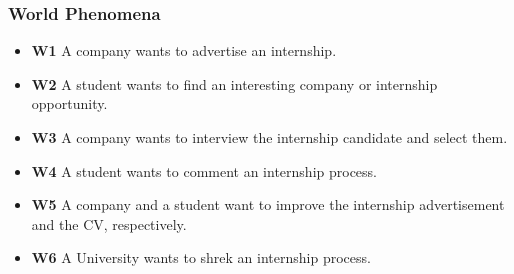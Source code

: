 \documentclass[a4paper,12pt]{article}
\begin{document}
\subsubsection{World Phenomena}
    \begin{itemize}
        \item \textbf{W1} A company wants to advertise an internship. 
        \item \textbf{W2} A student wants to find an interesting company or internship opportunity.
        \item \textbf{W3} A company wants to interview the internship candidate and select them.
        \item \textbf{W4} A student wants to comment an internship process.    
        \item \textbf{W5} A company and a student want to improve the internship advertisement and the CV, respectively.
        \item \textbf{W6} A University wants to shrek an internship process.
    \end{itemize}
\end{document}
